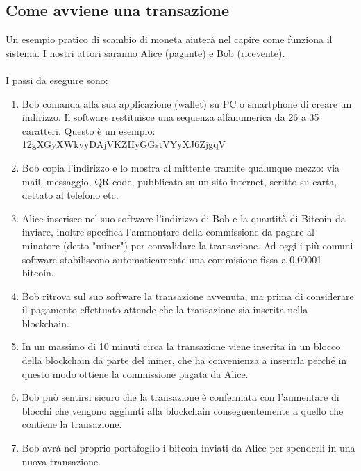 \subsection{Come avviene una transazione}
\label{sec:come avviene una transazione}
Un esempio pratico di scambio di moneta aiuterà nel capire come funziona il sistema. I nostri attori saranno Alice (pagante) e Bob (ricevente).
\\
\\I passi da eseguire sono:
\begin{enumerate}\itemsep2pt

\item Bob comanda alla sua applicazione (wallet) su PC o smartphone di creare un indirizzo. Il software restituisce una sequenza alfanumerica da 26 a 35 caratteri. Questo è un esempio: 12gXGyXWkvyDAjVKZHyGGstVYyXJ6ZjgqV

\item Bob copia l'indirizzo e lo mostra al mittente tramite qualunque mezzo: via mail, messaggio, QR code, pubblicato su un sito internet, scritto su carta, dettato al telefono etc.

\item Alice inserisce nel suo software l'indirizzo di Bob e la quantità di Bitcoin da inviare, inoltre specifica l'ammontare della commissione da pagare al minatore (detto "miner") per convalidare la transazione. Ad oggi i più comuni software stabiliscono automaticamente una commisione fissa a 0,00001 bitcoin.

\item Bob ritrova sul suo software la transazione avvenuta, ma prima di considerare il pagamento effettuato attende che la transazione sia inserita nella blockchain.

\item In un massimo di 10 minuti circa la transazione viene inserita in un blocco della blockchain da parte del miner, che ha convenienza a inserirla perché in questo modo ottiene la commissione pagata da Alice.

\item Bob può sentirsi sicuro che la transazione è confermata con l’aumentare di blocchi che vengono aggiunti alla blockchain conseguentemente a quello che contiene la transazione. 

\item Bob avrà nel proprio portafoglio i bitcoin inviati da Alice per spenderli in una nuova transazione.
\end{enumerate}

